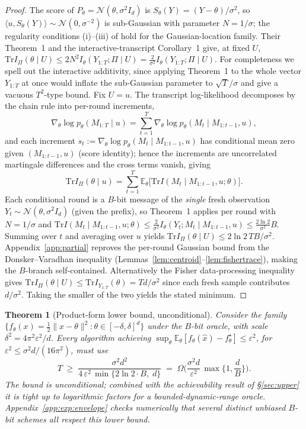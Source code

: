 \documentclass[11pt]{article}
\newtheorem{theorem}{Theorem}
\theoremstyle{definition}
\newcommand{\E}{\mathbb{E}}
\newcommand{\Tr}{\mathrm{Tr}}
\newcommand{\eps}{\varepsilon}
\newcommand{\Ncal}{\mathcal{N}}
\begin{document}
\begin{proof}
The score of $P_\theta=\Ncal(\theta,\sigma^2I_d)$ is $S_\theta(Y)=(Y-\theta)/\sigma^2$, so
$\langle u,S_\theta(Y)\rangle\sim\Ncal(0,\sigma^{-2})$ is sub-Gaussian with parameter $N=1/\sigma$; the
regularity conditions (i)--(iii) of \citet{barnes2021fisher} hold for the Gaussian-location family.
Their Theorem~1 and the interactive-transcript Corollary~1 give, at fixed $U$,
$\Tr I_\Pi(\theta\mid U)\le 2N^2 I_\theta(Y_{1:T};\Pi\mid U)=\tfrac{2}{\sigma^2}I_\theta(Y_{1:T};\Pi\mid U)$.
For completeness we spell out the interactive additivity, since applying Theorem~1 to the whole vector
$Y_{1:T}$ at once would inflate the sub-Gaussian parameter to $\sqrt{T}/\sigma$ and give a vacuous
$T^2$-type bound. Fix $U=u$. The transcript log-likelihood decomposes by the chain rule into per-round
increments,
\[
  \nabla_\theta\log p_\theta(M_{1:T}\mid u)=\sum_{t=1}^T \nabla_\theta\log p_\theta(M_t\mid M_{1:t-1},u),
\]
and each increment $s_t:=\nabla_\theta\log p_\theta(M_t\mid M_{1:t-1},u)$ has conditional mean zero given
$(M_{1:t-1},u)$ (score identity); hence the increments are uncorrelated martingale differences and the
cross terms vanish, giving
\[
  \Tr I_\Pi(\theta\mid u)=\sum_{t=1}^T \E_\theta\big[\Tr I(M_t\mid M_{1:t-1},u;\theta)\big].
\]
Each conditional round is a $B$-bit message of the \emph{single} fresh observation $Y_t\sim\Ncal(\theta,\sigma^2 I_d)$
(given the prefix), so Theorem~1 applies per round with $N=1/\sigma$ and
$\Tr I(M_t\mid M_{1:t-1},u;\theta)\le\tfrac{2}{\sigma^2}I_\theta(Y_t;M_t\mid M_{1:t-1},u)\le\tfrac{2\ln2}{\sigma^2}B$.
Summing over $t$ and averaging over $u$ yields $\Tr I_\Pi(\theta\mid U)\le 2\ln2\,TB/\sigma^2$.
Appendix~\ref{app:partial} reproves the per-round Gaussian bound from the Donsker--Varadhan inequality
(Lemmas~\ref{lem:centroid}--\ref{lem:fishertrace}), making the $B$-branch self-contained.
Alternatively the Fisher data-processing inequality \citep{zamir1998fisher} gives
$\Tr I_\Pi(\theta\mid U)\le\Tr I_{Y_{1:T}}(\theta)=Td/\sigma^2$ since each fresh sample contributes
$d/\sigma^2$. Taking the smaller of the two yields the stated minimum.
\end{proof}

\begin{theorem}[Product-form lower bound, unconditional]
\label{thm:product}
Consider the family $\{f_\theta(x)=\tfrac12\|x-\theta\|^2:\theta\in[-\delta,\delta]^d\}$ under the $B$-bit
oracle, with scale $\delta^2=4\pi^2\eps^2/d$. Every algorithm achieving
$\sup_{\theta}\E_\theta[f_\theta(\hat x)-f_\theta^\star]\le\eps^2$, for $\eps^2\le\sigma^2 d/(16\pi^2)$,
must use
\[
  T\;\ge\;\frac{\sigma^{2} d^{2}}{4\,\eps^{2}\,\min\{2\ln2\cdot B,\;d\}}
  \;=\;\Omega\!\Big(\frac{\sigma^2 d}{\eps^2}\,\max\!\Big\{1,\frac{d}{B}\Big\}\Big).
\]
The bound is unconditional; combined with the achievability result of \S\ref{sec:upper} it is tight up
to logarithmic factors for a bounded-dynamic-range oracle. Appendix~\ref{app:exp:envelope} checks
numerically that several distinct unbiased $B$-bit schemes all respect this lower bound.
\end{theorem}
\end{document}
